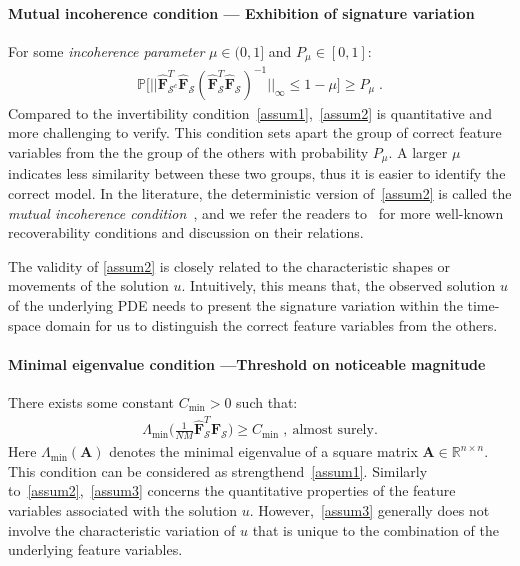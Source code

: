 \documentclass[a4paper,11pt]{article}
\newcommand{\bF}{\mathbf{F}}
\newcommand{\mS}{\mathcal{S}}
\begin{document}
\paragraph{Mutual incoherence condition --- Exhibition of signature variation} For some \textit{incoherence parameter} $\mu\in (0,1]$ and $P_\mu\in [0,1]$:
\begin{align}
\mathbb{P}\big[||\widehat{\bF}_{\mS^c}^T\widehat{\bF}_\mS(\widehat{\bF}_{\mS}^T\widehat{\bF}_\mS)^{-1}||_\infty\leq 1-\mu\big]\geq P_\mu\;.\label{assum2}\tag{A2}
\end{align}
Compared to the invertibility condition~\eqref{assum1},~\eqref{assum2} is  quantitative and more challenging to verify. This condition sets apart the group of correct feature variables from the the group of the others with probability $P_\mu$. A larger $\mu$ indicates less similarity between these two groups, thus it is easier to identify the correct model. In the literature, the deterministic version of~\eqref{assum2} is called the \textit{mutual incoherence condition}~\cite{fuchs2005recovery, tropp2006just,wainwright2009sharp}, and we refer the readers to~\cite{van2009conditions} for more well-known recoverability conditions and discussion on their relations.

The validity of \eqref{assum2} is closely related to the characteristic shapes or movements of the solution $u$. Intuitively, this means that, the observed solution $u$ of the underlying PDE needs to present the signature variation within the time-space domain for us to distinguish the correct feature variables from the others. 
\paragraph{Minimal eigenvalue condition ---Threshold on noticeable magnitude} There exists some constant $C_{\min}>0$ such that:
\begin{align}
\Lambda_{\min}\Big(\frac{1}{NM}\widehat{\bF}_\mS^T\widehat{\bF}_\mS\Big)\geq C_{\min}\;,~\text{almost surely.}\label{assum3}\tag{A3}
\end{align}
Here $\Lambda_{\min}(\mathbf{A})$ denotes the minimal eigenvalue of a square matrix $\mathbf{A}\in\mathbb{R}^{n\times n}$. This condition can be considered as strengthend~\eqref{assum1}. Similarly to~\eqref{assum2},~\eqref{assum3} concerns the quantitative properties of the feature variables associated with the solution $u$. However,~\eqref{assum3} generally does not involve the characteristic variation of $u$ that is unique to the combination of the underlying feature variables. 
\end{document}
